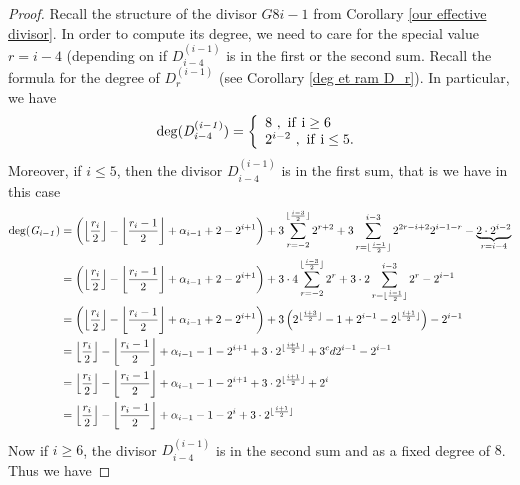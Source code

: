 \documentclass[10pt]{article}
\begin{document}
\s

\begin{proof}
Recall the structure of the divisor $G8{i-1}$ from Corollary \ref{our effective divisor}. In order to compute its degree, we need to care for the special value $r=i-4$ (depending on if $D_{i-4}^{(i-1)}$ is in the first or the second sum. Recall the formula for the degree of $D_r^{(i-1)}$ (see Corollary \ref{deg et ram D_r}). In particular, we have 
\begin{equation*}
\rm{deg} (\it D_{i- \rm 4}^{(i-1)}) = \left\{ \begin{array}{ll}
8 \ , \ \rm{if} \ i \geq 6 \\
2^{i-2} \ , \ \rm{if} \ i \leq 5.
\end{array}
\right.
\end{equation*}
Moreover, if $i \leq 5$, then the divisor $D_{i-4}^{(i-1)}$ is in the first sum, that is we have in this case
\begin{align*}
\rm{deg}(\it G_{i-1}) &= \left( \left \lfloor \frac{r_i}{2}\right\rfloor - \left \lfloor \frac{r_i-1}{2}\right\rfloor + \alpha_{i-1} +2-2^{i+1}\right) + 3\sum\limits_{r=-2}^{\lfloor \frac{i-3}{2}\rfloor} 2^{r+2} +3 \sum\limits_{r=\lfloor \frac{i-1}{2}\rfloor}^{i-3} 2^{2r-i+2}2^{i-1-r} - \underbrace{2\cdot 2^{i-2}}_{r=i-4} \\
&= \left( \left \lfloor \frac{r_i}{2}\right\rfloor - \left \lfloor \frac{r_i-1}{2}\right\rfloor + \alpha_{i-1} +2-2^{i+1}\right) + 3 \cdot 4\sum\limits_{r=-2}^{\lfloor \frac{i-3}{2}\rfloor} 2^{r} + 3 \cdot 2 \sum\limits_{r=\lfloor \frac{i-1}{2}\rfloor}^{i-3} 2^r - 2^{i-1} \\
&= \left( \left \lfloor \frac{r_i}{2}\right\rfloor - \left \lfloor \frac{r_i-1}{2}\right\rfloor + \alpha_{i-1} +2-2^{i+1}\right) + 3 \left( 2^{\lfloor \frac{i+3}{2} \rfloor}-1 + 2^{i-1} - 2^{\lfloor \frac{i+1}{2}\rfloor} \right) - 2^{i-1} \\
&= \left \lfloor \frac{r_i}{2}\right\rfloor - \left \lfloor \frac{r_i-1}{2}\right\rfloor + \alpha_{i-1} -1-2^{i+1} + 3 \cdot 2^{\lfloor \frac{i+1}{2}\rfloor} + 3^cd 2^{i-1}-2^{i-1} \\
&=\left \lfloor \frac{r_i}{2}\right\rfloor - \left \lfloor \frac{r_i-1}{2}\right\rfloor + \alpha_{i-1} -1-2^{i+1} + 3 \cdot 2^{\lfloor \frac{i+1}{2}\rfloor} + 2^i \\
&=\left \lfloor \frac{r_i}{2}\right\rfloor - \left \lfloor \frac{r_i-1}{2}\right\rfloor + \alpha_{i-1} -1-2^{i} + 3 \cdot 2^{\lfloor \frac{i+1}{2}\rfloor}
\end{align*}
Now if $i \geq 6$, the divisor $D_{i-4}^{(i-1)}$ is in the second sum and as a fixed degree of $8$. Thus we have 

\end{proof}
\end{document}
